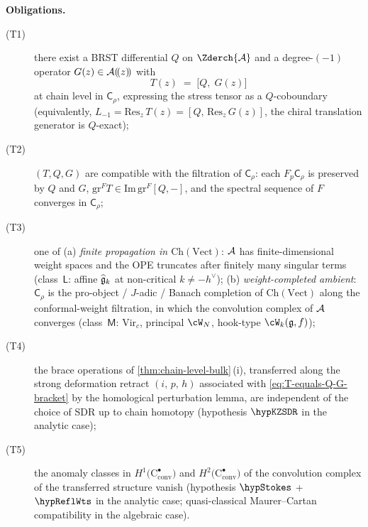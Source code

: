 \begin{theorem}
\noindent\textbf{Obligations.}\enspace
\begin{description}
\item[\textup{(T1)}] there exist a BRST differential $Q$ on
$\Zderch{\cA}$ and a degree-$(-1)$ operator $G(z) \in \mathcal{A}(\!(z)\!)$
with
\begin{equation}\label{eq:T-equals-Q-G-bracket}
 T(z) \;=\; \bigl[Q,\; G(z)\bigr]
\end{equation}
at chain level in $\mathsf{C}_{\rho}$, expressing the stress tensor
as a $Q$-coboundary (equivalently, $L_{-1} = \mathrm{Res}_{z}\, T(z)
= [Q,\, \mathrm{Res}_{z}\, G(z)]$, the chiral translation generator
is $Q$-exact);
\item[\textup{(T2)}] $(T, Q, G)$ are compatible with the filtration of
$\mathsf{C}_{\rho}$: each $F_{p}\mathsf{C}_{\rho}$ is preserved by
$Q$ and $G$, $\mathrm{gr}^{F}T \in \mathrm{Im}\,\mathrm{gr}^{F}[Q,-]$,
and the spectral sequence of $F$ converges in $\mathsf{C}_{\rho}$;
\item[\textup{(T3)}] one of
\textup{(a)} \emph{finite propagation in
$\mathrm{Ch}(\mathrm{Vect})$}: $\mathcal{A}$ has finite-dimensional weight
spaces and the OPE truncates after finitely many singular terms
\textup{(}class~$\mathsf{L}$: affine $\widehat{\mathfrak{g}}_{k}$ at
non-critical $k \ne -h^{\vee}$\textup{)};
\textup{(b)} \emph{weight-completed ambient}: $\mathsf{C}_{\rho}$ is
the pro-object / $J$-adic / Banach completion of
$\mathrm{Ch}(\mathrm{Vect})$ along the conformal-weight filtration,
in which the convolution complex of $\mathcal{A}$ converges
\textup{(}class~$\mathsf{M}$: $\mathrm{Vir}_{c}$, principal $\cW_{N}$,
hook-type $\cW_{k}(\fg, f)$\textup);
\item[\textup{(T4)}] the brace operations of
\cref{thm:chain-level-bulk}\,(i), transferred along the strong
deformation retract $(i,\,p,\,h)$ associated with
\eqref{eq:T-equals-Q-G-bracket} by the homological perturbation
lemma, are independent of the choice of SDR up to chain homotopy
(hypothesis $\hypKZSDR$ in the analytic case);
\item[\textup{(T5)}] the anomaly classes in
$H^{1}\bigl(\mathrm{C}^{\bullet}_{\mathrm{conv}}\bigr)$ and
$H^{2}\bigl(\mathrm{C}^{\bullet}_{\mathrm{conv}}\bigr)$ of the
convolution complex of the transferred structure vanish (hypothesis
$\hypStokes$ + $\hypReflWts$ in the analytic case;
quasi-classical Maurer--Cartan compatibility in the algebraic case).
\end{description}


\end{theorem}
